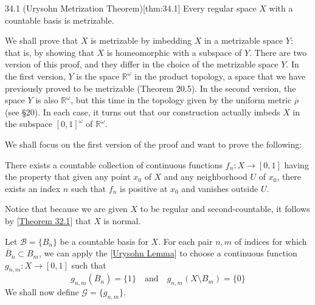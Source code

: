 \begin{thmBox}{34.1 (Urysohn Metrization Theorem)}[thm:34.1]
    Every regular space \( X \) with a countable basis is metrizable.

    \baseRule

    \begin{proofBox}
        We shall prove that \( X \) is metrizable by imbedding \( X \) in a 
        metrizable space \( Y \); that is, by showing that \( X \) is homeomorphic
        with a subspace of \( Y \).
        There are two version of this proof, and they differ in the choice of the 
        metrizable space \( Y \).
        In the first version, \( Y \) is the space \( \mathbb{R}^{ \omega } \) in the
        product topology, a space that we have previously proved to be metrizable
        (Theorem 20.5). In the second version, the space \( Y \) is also 
        \( \mathbb{R}^{ \omega } \), but this time in the topology given by the
        uniform metric \( \overline{ \rho } \) (see \S 20). In each case, it turns
        out that our construction actually imbeds \( X \) in the subspace 
        \( [ 0, 1 ]^{ \omega } \) of \( \mathbb{R}^{ \omega } \).

        \baseSkip

        We shall focus on the first version of the proof and want to prove the 
        following:
        \begin{center}
            There exists a countable collection of continuous functions
            \( f_{ n }: X \rightarrow [ 0, 1 ] \) having the property that given any
            point \( x_{ 0 } \) of \( X \) and any neighborhood \( U \) of 
            \( x_{ 0 } \), there exists an index \( n \) such that \( f_{ n } \) is 
            positive at \( x_{ 0 } \) and vanishes outside \( U \).
        \end{center}
        Notice that because we are given \( X \) to be regular and second-countable,
        it follows by [\hyperlink{thm:32.1}{Theorem 32.1}] that \( X \) is normal.
        
        \baseSkip

        Let \( \mathcal{B} = \{ B_{ n } \} \) be a countable basis for \( X \).
        For each pair \( n, m \) of indices for which 
        \( \overline{ B }_{ n } \subset B_{ m } \), we can apply the 
        [\hyperlink{thm:33.1}{Urysohn Lemma}] to choose a continuous function
        \( g_{ n, m }: X \rightarrow [ 0, 1 ] \) such that 
        \begin{equation*}
            g_{ n, m } ( \overline{ B }_{ n } ) = \{ 1 \}
            \quad \mathrm{and} \quad 
            g_{ n, m } ( X \setminus B_{ m } )
            =
            \{ 0 \}
        \end{equation*}
        We shall now define \( \mathcal{G} = \{ g_{ n, m } \} \).


\end{proofBox}
\end{thmBox}
